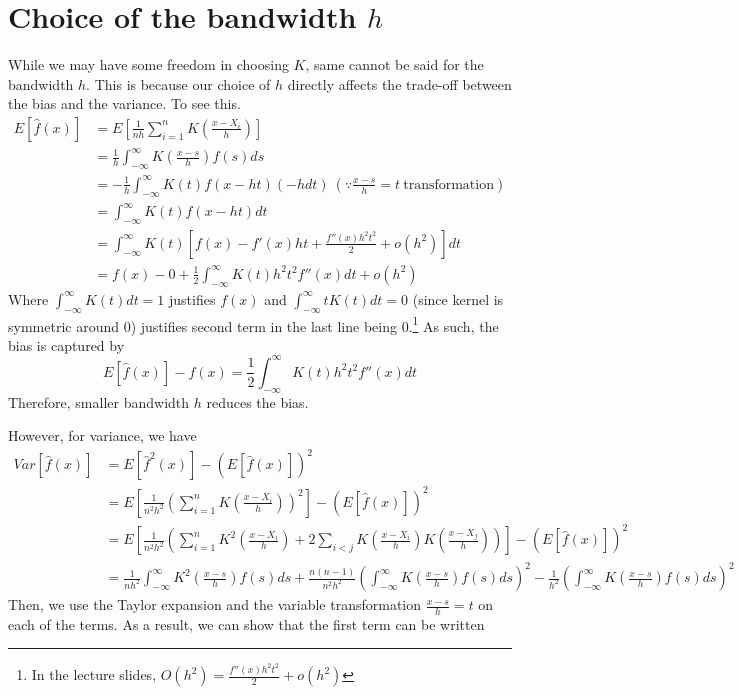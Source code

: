 \section{Choice of the bandwidth $h$}
While we may have some freedom in choosing $K$, same cannot be said for the bandwidth $h$. This is because our choice of $h$ directly affects the trade-off between the bias and the variance. To see this.
\footnotesize{\begin{align*}
E[\hat{f}(x)]&=E\left[\frac{1}{nh}\sum_{i=1}^n K\left(\frac{x-X_i}{h}\right)\right]\\
&=\frac{1}{h}\int_{-\infty}^\infty K\left(\frac{x-s}{h}\right)f(s)ds\\
&=-\frac{1}{h}\int_{-\infty}^\infty K(t)f(x-ht)(-hdt) \ (\because \frac{x-s}{h}=t \ \text{transformation})\\
&=\int_{-\infty}^\infty K(t)f(x-ht)dt\\
&=\int_{-\infty}^\infty K(t)\left[f(x)-f'(x)ht + \frac{f''(x)h^2t^2}{2}+o(h^2)\right]dt\\
&=f(x)-0+\frac{1}{2}\int_{-\infty}^\infty K(t)h^2t^2f''(x)dt + o(h^2)
\end{align*}}\normalsize
Where $\int_{-\infty}^\infty K(t)dt=1$ justifies $f(x)$ and $\int_{-\infty}^\infty tK(t)dt=0$ (since kernel is symmetric around 0) justifies second term in the last line being 0.\footnote{In the lecture slides, $O(h^2)=\frac{f''(x)h^2t^2}{2}+o(h^2)$} As such, the bias is captured by 
\[
E[\hat{f}(x)]-f(x)=\frac{1}{2}\int_{-\infty}^\infty K(t)h^2t^2f''(x)dt
\]
Therefore, smaller bandwidth $h$ reduces the bias.\par
 However, for variance, we have
 \footnotesize{\begin{align*}
Var[\hat{f}(x)]&=E[\hat{f}^2(x)]-(E[\hat{f}(x)])^2\\ 
&=E\left[\frac{1}{n^2h^2}\left(\sum_{i=1}^nK\left(\frac{x-X_i}{h}\right)\right)^2\right]-(E[\hat{f}(x)])^2\\
&=E\left[\frac{1}{n^2h^2}\left(\sum_{i=1}^nK^2\left(\frac{x-X_i}{h}\right)+2\sum_{i<j} K\left(\frac{x-X_i}{h}\right)K\left(\frac{x-X_j}{h}\right)\right)\right]-(E[\hat{f}(x)])^2\\
&=\frac{1}{nh^2}\int_{-\infty}^\infty K^2\left(\frac{x-s}{h}\right)f(s)ds+\frac{n(n-1)}{n^2h^2}\left(\int_{-\infty}^\infty K\left(\frac{x-s}{h}\right)f(s)ds\right)^2-\frac{1}{h^2}\left(\int_{-\infty}^\infty K\left(\frac{x-s}{h}\right)f(s)ds\right)^2
 \end{align*}}\normalsize
 Then, we use the Taylor expansion and the variable transformation $\frac{x-s}{h}=t$ on each of the terms. As a result, we can show that the first term can be written
